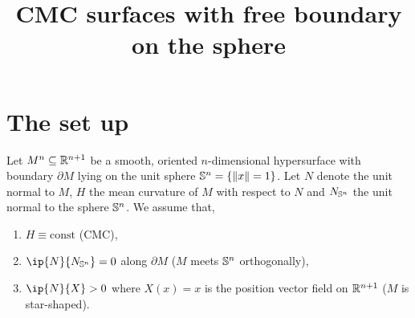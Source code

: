 \documentclass{amsart}
\title[]{CMC surfaces with free boundary on the sphere}
\begin{document}
\begin{abstract}
\end{abstract}

\maketitle

\section{The set up}

Let \(M^n \subseteq \R^{n+1}\) be a smooth, oriented \(n\)-dimensional hypersurface with boundary \(\partial M\) lying on the unit sphere \(\S^n = \{\|x\| = 1\}\). Let \(N\) denote the unit normal to \(M\), \(H\) the mean curvature of \(M\) with respect to \(N\) and \(N_{\S^n}\) the unit normal to the sphere \(\S^n\). We assume that,
\begin{enumerate}
\item \(H \equiv \text{const}\) (CMC),
\item \(\ip{N}{N_{\S^n}} = 0\) along \(\partial M\) (\(M\) meets \(\S^n\) orthogonally),
\item \(\ip{N}{X} > 0\) where \(X(x) = x\) is the position vector field on \(\R^{n+1}\) (\(M\) is star-shaped).
\end{enumerate}
  
\end{document}
